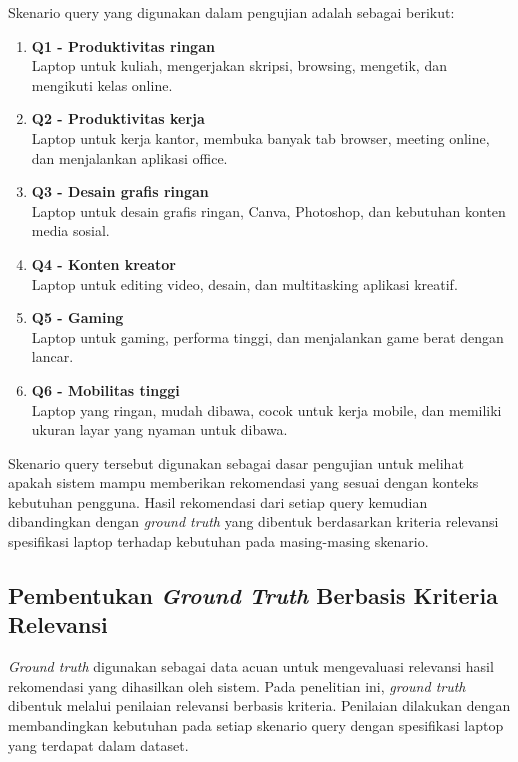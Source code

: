 \noindent Skenario query yang digunakan dalam pengujian adalah sebagai berikut:
\begin{enumerate}
\item \textbf{Q1 - Produktivitas ringan} \\
Laptop untuk kuliah, mengerjakan skripsi, browsing, mengetik, dan mengikuti kelas online.
\item \textbf{Q2 - Produktivitas kerja} \\
Laptop untuk kerja kantor, membuka banyak tab browser, meeting online, dan menjalankan aplikasi office.
\item \textbf{Q3 - Desain grafis ringan} \\
Laptop untuk desain grafis ringan, Canva, Photoshop, dan kebutuhan konten media sosial.
\item \textbf{Q4 - Konten kreator} \\
Laptop untuk editing video, desain, dan multitasking aplikasi kreatif.
\item \textbf{Q5 - Gaming} \\
Laptop untuk gaming, performa tinggi, dan menjalankan game berat dengan lancar.
\item \textbf{Q6 - Mobilitas tinggi} \\
Laptop yang ringan, mudah dibawa, cocok untuk kerja mobile, dan memiliki ukuran layar yang nyaman untuk dibawa.
\end{enumerate}

Skenario query tersebut digunakan sebagai dasar pengujian untuk melihat apakah sistem mampu memberikan rekomendasi yang sesuai dengan konteks kebutuhan pengguna. Hasil rekomendasi dari setiap query kemudian dibandingkan dengan \textit{ground truth} yang dibentuk berdasarkan kriteria relevansi spesifikasi laptop terhadap kebutuhan pada masing-masing skenario.

\subsection{Pembentukan \textit{Ground Truth} Berbasis Kriteria Relevansi}
\textit{Ground truth} digunakan sebagai data acuan untuk mengevaluasi relevansi hasil rekomendasi yang dihasilkan oleh sistem. Pada penelitian ini, \textit{ground truth} dibentuk melalui penilaian relevansi berbasis kriteria. Penilaian dilakukan dengan membandingkan kebutuhan pada setiap skenario query dengan spesifikasi laptop yang terdapat dalam dataset.

